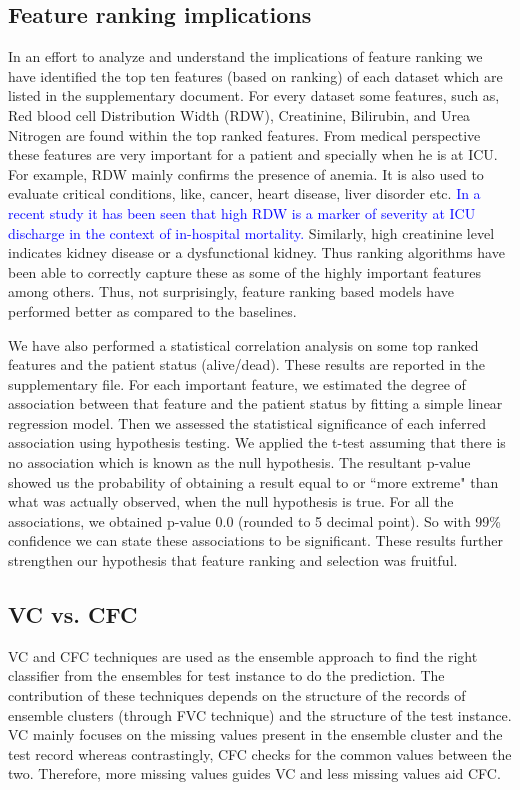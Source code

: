 \subsection{Feature ranking implications}
In an effort to analyze and understand the implications of feature ranking we have identified the top ten features (based on ranking) of each dataset which are listed in the supplementary document. For every dataset some features, such as, Red blood cell Distribution Width (RDW), Creatinine, Bilirubin, and Urea Nitrogen are found within the top ranked features. From medical perspective these features are very important for a patient and specially when he is at ICU. For example, RDW mainly confirms the presence of anemia. It is also used to evaluate critical conditions, like, cancer, heart disease, liver disorder etc. \textcolor{blue}{In a recent study \cite{Fernandez2018} it has been seen that high RDW is a marker of severity at ICU discharge in the context of in-hospital mortality.} Similarly, high creatinine level indicates kidney disease or a dysfunctional kidney. Thus ranking algorithms have been able to correctly capture these as some of the highly important features among others. Thus, not surprisingly, feature ranking based models have performed better as compared to the baselines.   

We have also performed a statistical correlation analysis on some top ranked features and the patient status (alive/dead). These results are reported in the supplementary file. For each important feature, we estimated the degree of association between that feature and the patient status by fitting a simple linear regression model. Then we assessed the statistical significance of each inferred association using hypothesis testing. We applied the t-test assuming that there is no association which is known as the null hypothesis. The resultant p-value showed us the probability of obtaining a result equal to or ``more extreme" than what was actually observed, when the null hypothesis is true. For all the associations, we obtained p-value 0.0 (rounded to 5 decimal point). So with 99\% confidence we can state these associations to be significant. These results further strengthen our hypothesis that feature ranking and selection was fruitful.        

\subsection{VC vs. CFC}
VC and CFC techniques are used as the ensemble approach to find the right classifier from the ensembles for test instance to do the prediction. The contribution of these techniques depends on the structure of the records of ensemble clusters (through FVC technique) and the structure of the test instance. VC mainly focuses on the missing values present in the ensemble cluster and the test record whereas contrastingly, CFC checks for the common values between the two. Therefore, more missing values guides VC and less missing values aid CFC. 

